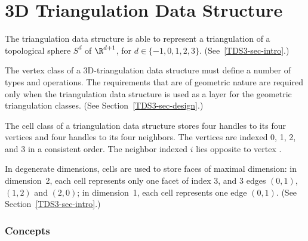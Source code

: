 \chapter{3D Triangulation Data Structure}

The triangulation data structure is able to represent a
triangulation of a topological sphere $S^d$ of $\R^{d+1}$, for 
$d \in \{-1,0,1,2,3\}$. (See~\ref{TDS3-sec-intro}.)

The vertex class of a 3D-triangulation data structure must define
a number of types and operations. 
The requirements that are of geometric nature are required only when
the triangulation data structure is used as a layer for the geometric
triangulation classes. (See Section~\ref{TDS3-sec-design}.)

The cell class of a triangulation data structure stores
four handles to its four vertices and four handles to its four
neighbors. The vertices are indexed 0, 1, 2, and 3 in a consistent order.
The neighbor indexed $i$ lies opposite to vertex .

In degenerate dimensions, cells are used to store faces of maximal
dimension: in dimension~2, each cell represents only one
facet of index 3, and 3 edges $(0,1)$, $(1,2)$ and $(2,0)$; in
dimension~1, each cell represents one edge $(0,1)$. (See 
Section~\ref{TDS3-sec-intro}.) 

\subsection*{Concepts}


 \\

